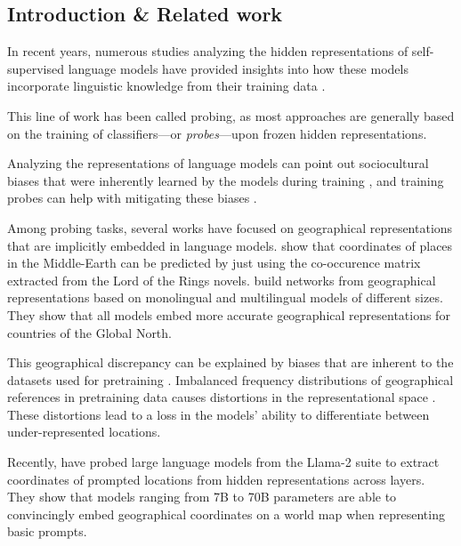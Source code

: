 

\subsection{Introduction \& Related work}

In recent years, numerous studies analyzing the hidden representations of self-supervised language models have provided insights into how these models incorporate linguistic knowledge from their training data \citep{gupta-etal-2015-distributional,kohn-2015-whats,shi-etal-2016-string,ijcai2018p796,conneau-etal-2018-cram,jawahar-etal-2019-bert}. 

This line of work has been called probing, as most approaches are generally based on the training of classifiers---or \textit{probes}---upon frozen hidden representations.

Analyzing the representations of language models can point out sociocultural biases that were inherently learned by the models during training \citep{zhao-etal-2018-gender}, and training probes can help with mitigating these biases \citep{ravfogel-etal-2020-null, iskander-etal-2023-shielded}.

Among probing tasks, several works have focused on geographical representations that are implicitly embedded in language models. \citet{lotr} show that coordinates of places in the Middle-Earth can be predicted by just using the co-occurence matrix extracted from the Lord of the Rings novels. \citet{faisal-anastasopoulos-2022-geographic} build networks from geographical representations based on monolingual and multilingual models of different sizes. They show that all models embed more accurate geographical representations for countries of the Global North.

This geographical discrepancy can be explained by biases that are inherent to the datasets used for pretraining \citet{faisal-etal-2022-dataset}. Imbalanced frequency distributions of geographical references in pretraining data causes distortions in the representational space \citep{zhou2021freqbased}. These distortions lead to a loss in the models' ability to differentiate between under-represented locations.

Recently, \citet{gurnee2023language} have probed large language models from the Llama-2 suite \citep{touvron2023llama} to extract coordinates of prompted locations from hidden representations across layers. They show that models ranging from 7B to 70B parameters are able to convincingly embed geographical coordinates on a world map when representing basic prompts.

